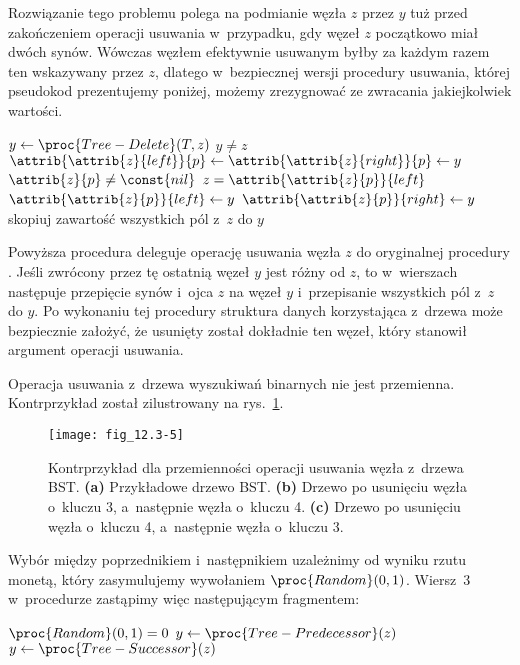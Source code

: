 Rozwiązanie tego problemu polega na podmianie węzła $z$ przez $y$ tuż przed zakończeniem operacji usuwania w~przypadku, gdy węzeł $z$ początkowo miał dwóch synów.
Wówczas węzłem efektywnie usuwanym byłby za każdym razem ten wskazywany przez $z$, dlatego w~bezpiecznej wersji procedury usuwania, której pseudokod prezentujemy poniżej, możemy zrezygnować ze zwracania jakiejkolwiek wartości.
\begin{codebox}
\li	$y\gets\proc{Tree-Delete}(T,z)$
\li	\If $y\ne z$
\li		\Then
			$\attrib{\attrib{z}{left}}{p}\gets\attrib{\attrib{z}{right}}{p}\gets y$ \label{li:safe-tree-delete-substitute-begin}
\li			\If $\attrib{z}{p}\ne\const{nil}$
\li				\Then
					\If $z=\attrib{\attrib{z}{p}}{left}$
\li						\Then $\attrib{\attrib{z}{p}}{left}\gets y$
\li						\Else $\attrib{\attrib{z}{p}}{right}\gets y$
						\End
				\End
\li			skopiuj zawartość wszystkich pól z~$z$ do $y$ \label{li:safe-tree-delete-substitute-end}
		\End
\end{codebox}

Powyższa procedura deleguje operację usuwania węzła $z$ do oryginalnej procedury .
Jeśli zwrócony przez tę ostatnią węzeł $y$ jest różny od $z$, to w~wierszach \doubledash{\ref{li:safe-tree-delete-substitute-begin}}{\ref{li:safe-tree-delete-substitute-end}} następuje przepięcie synów i~ojca $z$ na węzeł $y$ i~przepisanie wszystkich pól z~$z$ do $y$.
Po wykonaniu tej procedury struktura danych korzystająca z~drzewa może bezpiecznie założyć, że usunięty został dokładnie ten węzeł, który stanowił argument operacji usuwania.

\exercise %
Operacja usuwania z~drzewa wyszukiwań binarnych nie jest przemienna. Kontrprzykład został zilustrowany na rys.\ \ref{fig:12.3-5}.
\begin{figure}[ht]
	\begin{center}
		\texttt{[image: fig\_12.3-5]}
	\end{center}
	\caption{Kontrprzykład dla przemienności operacji usuwania węzła z~drzewa BST.
{\sffamily\bfseries(a)} Przykładowe drzewo BST.
{\sffamily\bfseries(b)} Drzewo po usunięciu węzła o~kluczu 3, a~następnie węzła o~kluczu 4.
{\sffamily\bfseries(c)} Drzewo po usunięciu węzła o~kluczu 4, a~następnie węzła o~kluczu 3.} \label{fig:12.3-5}
\end{figure}

\exercise %
Wybór między poprzednikiem i~następnikiem uzależnimy od wyniku rzutu monetą, który zasymulujemy wywołaniem $\proc{Random}(0,1)$.
Wiersz~3 w~procedurze  zastąpimy więc następującym fragmentem:
\begin{codebox}
\zi	\If $\proc{Random}(0,1)=0$
\zi		\Then $y\gets\proc{Tree-Predecessor}(z)$
\zi		\Else $y\gets\proc{Tree-Successor}(z)$
\zi		\End
\end{codebox}

